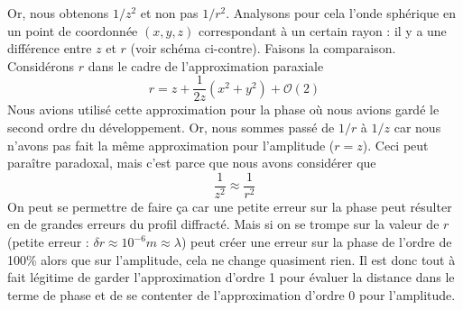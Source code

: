 Or, nous obtenons $1/z^2$ et non pas $1/r^2$. Analysons pour cela l'onde sphérique en un 
point de coordonnée $(x,y,z)$ correspondant à un certain rayon : il y a une différence 
entre $z$ et $r$ (voir schéma ci-contre). Faisons la comparaison. Considérons $r$ dans le 
cadre de l'approximation paraxiale
\begin{equation}
r = z+\frac{1}{2z}(x^2+y^2) + \mathcal{O}(2)
\end{equation}
Nous avions utilisé cette approximation pour la phase où nous avions gardé le second ordre 
du développement. Or, nous sommes passé de $1/r$ à $1/z$ car nous n'avons pas fait la même 
approximation pour l'amplitude ($r=z$). Ceci peut paraître paradoxal, mais c'est parce que 
nous avons considérer que 
\begin{equation}
\frac{1}{z^2}\approx\frac{1}{r^2}
\end{equation}
On peut se permettre de faire ça car une petite erreur sur la phase peut résulter en de 
grandes erreurs du profil diffracté. Mais si on se trompe sur la valeur de $r$ (petite 
erreur : $\delta r \approx 10^{-6}m\approx \lambda$) peut créer une erreur sur la phase 
de l'ordre de 100\% alors que sur l'amplitude, cela ne change quasiment rien. Il est donc 
tout à fait légitime de garder l'approximation d'ordre 1 pour évaluer la distance dans le 
terme de phase et de se contenter de l'approximation d'ordre 0 pour l'amplitude.



















































